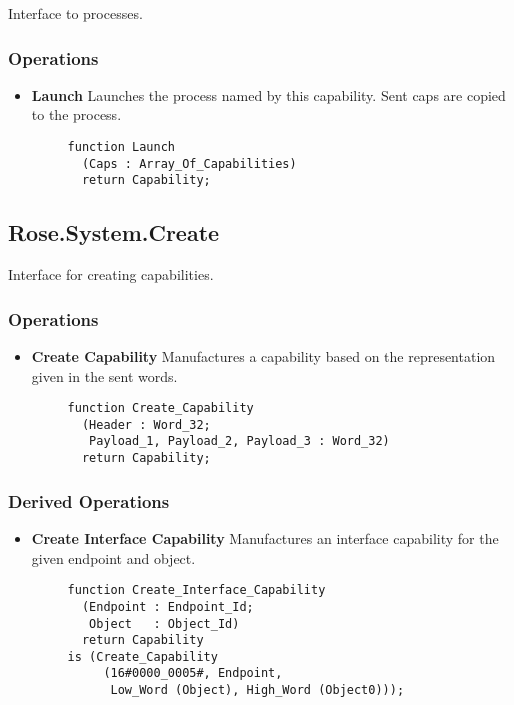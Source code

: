 Interface to processes.

\subsubsection{Operations}

\begin{itemize}
    \item \textbf{Launch} Launches the process named by this capability.  Sent caps are copied to the process.

    \begin{verbatim}
     function Launch
       (Caps : Array_Of_Capabilities)
       return Capability;    
    \end{verbatim}
    
\end{itemize}

\subsection{Rose.System.Create}

Interface for creating capabilities.

\subsubsection{Operations}

\begin{itemize}
    \item \textbf{Create Capability} Manufactures a capability based on the representation given
    in the sent words.
    
    \begin{verbatim}
     function Create_Capability
       (Header : Word_32;
        Payload_1, Payload_2, Payload_3 : Word_32)
       return Capability;    
    \end{verbatim}
    
\end{itemize}

\subsubsection{Derived Operations}

\begin{itemize}
    \item \textbf{Create Interface Capability} Manufactures an interface capability for the given endpoint and object.
    
    \begin{verbatim}
     function Create_Interface_Capability
       (Endpoint : Endpoint_Id;
        Object   : Object_Id)
       return Capability
     is (Create_Capability 
          (16#0000_0005#, Endpoint, 
           Low_Word (Object), High_Word (Object0)));
     
    \end{verbatim}
    
\end{itemize}

